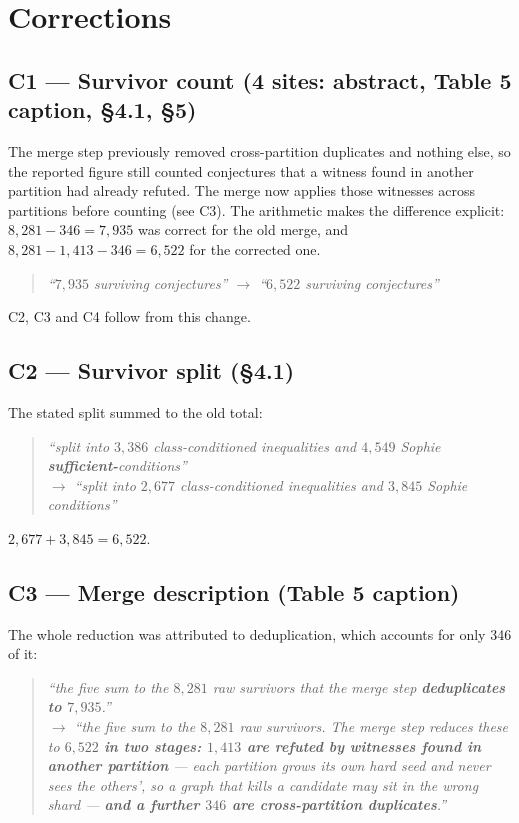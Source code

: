 \documentclass[11pt,a4paper]{article}
\newenvironment{chg}{%
  \begin{quote}\small\color{black!80}\itshape}{\end{quote}}
\begin{document}
\section{Corrections}

\subsection{C1 --- Survivor count (4 sites: abstract, Table 5 caption, \S4.1, \S5)}
The merge step previously removed cross-partition duplicates and nothing else, so
the reported figure still counted conjectures that a witness found in another
partition had already refuted. The merge now applies those witnesses across
partitions before counting (see C3). The arithmetic makes the difference
explicit: $8{,}281 - 346 = 7{,}935$ was correct for the old merge, and
$8{,}281 - 1{,}413 - 346 = 6{,}522$ for the corrected one.
\begin{chg}
``$7{,}935$ surviving conjectures'' $\rightarrow$ ``$6{,}522$ surviving conjectures''
\end{chg}
C2, C3 and C4 follow from this change.

\subsection{C2 --- Survivor split (\S4.1)}
The stated split summed to the old total:
\begin{chg}
``split into \textbf{$3{,}386$} class-conditioned inequalities and
\textbf{$4{,}549$} Sophie \textbf{sufficient-}conditions''\\
$\rightarrow$ ``split into \textbf{$2{,}677$} class-conditioned inequalities and
\textbf{$3{,}845$} Sophie conditions''
\end{chg}
$2{,}677 + 3{,}845 = 6{,}522$.

\subsection{C3 --- Merge description (Table 5 caption)}
The whole reduction was attributed to deduplication, which accounts for only 346
of it:
\begin{chg}
``the five sum to the $8{,}281$ raw survivors that the merge step
\textbf{deduplicates to $7{,}935$}.''\\
$\rightarrow$ ``the five sum to the $8{,}281$ raw survivors. The merge step
reduces these to $6{,}522$ \textbf{in two stages: $1{,}413$ are refuted by
witnesses found in another partition} --- each partition grows its own hard seed
and never sees the others', so a graph that kills a candidate may sit in the
wrong shard --- \textbf{and a further $346$ are cross-partition duplicates}.''
\end{chg}
\end{document}

